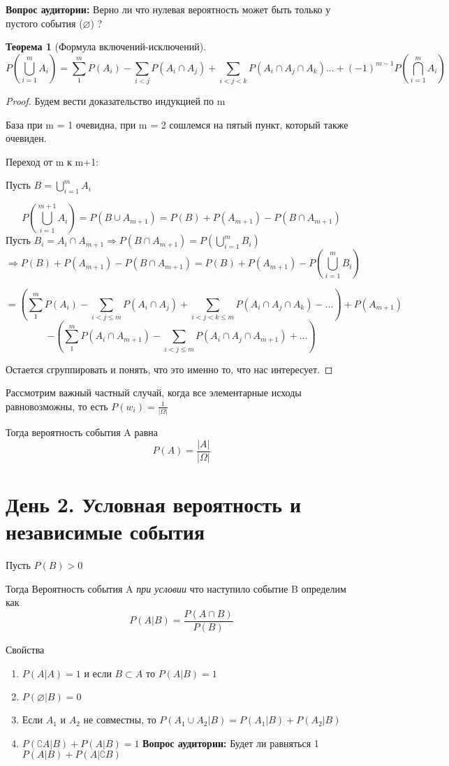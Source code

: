 \documentclass{article}
\renewcommand{\le}{\leqslant}
\newtheorem{theorem}{Теорема}
\theoremstyle{definition}
\newcommand{\question}{\textbf{Вопрос аудитории: }}
\theoremstyle{remark}
\begin{document}
\question{Верно ли что нулевая вероятность может быть только у пустого события ($\varnothing$) ?}

\begin{theorem} [Формула включений-исключений]
    $$ 
    P(\bigcup\limits_{i=1}^{m} A_i) = \sum_{1}^{m} P(A_i) - \sum_{i<j} P(A_i \cap A_j) + \sum_{i<j<k} P(A_i \cap A_j \cap A_k) ... + (-1)^{m-1} P(\bigcap\limits_{i=1}^{m} A_i)
    $$
\end{theorem}
\begin{proof}
    Будем вести доказательство индукцией по m

    База при m = 1 очевидна, при m = 2 сошлемся на пятый пункт, который также очевиден.

    Переход от m к m+1:

    Пусть $B = \bigcup\limits_{i=1}^{m} A_i$

    $$
    P(\bigcup\limits_{i=1}^{m+1} A_i) = P(B \cup A_{m+1}) = P(B) + P(A_{m+1}) - P(B \cap A_{m+1})
    $$
    Пусть $B_i = A_i \cap A_{m+1} \Rightarrow P(B \cap A_{m+1}) = P(\bigcup\limits_{i=1}^{m} B_i)$
    $$
    \Rightarrow P(B) + P(A_{m+1}) - P(B \cap A_{m+1}) = P(B) + P(A_{m+1}) - P(\bigcup\limits_{i=1}^{m} B_i) 
    $$

    $$
    = (\sum_{1}^{m} P(A_i)  - \sum_{i<j \le m} P(A_i \cap A_j)  + \sum_{i<j<k \le m} P(A_i \cap A_j \cap A_k) - ... ) + P(A_{m+1}) 
    $$
    $$
    - (\sum_{1}^{m} P(A_i \cap A_{m+1})  - \sum_{i<j \le m} P(A_i \cap A_j  \cap A_{m+1})  + ... )
    $$

    Остается сгруппировать и понять, что это именно то, что нас интересует.
\end{proof}

Рассмотрим важный частный случай, когда все элементарные исходы равновозможны, 
то есть $P(w_i) = \frac{1}{|\varOmega|}$

Тогда вероятность события A равна
$$
P(A) = \frac{|A|}{|\varOmega|}
$$


\section{День 2. Условная вероятность и независимые события}

Пусть $P(B) > 0$ 

Тогда Вероятность события A \textit{при условии} что наступило событие B определим как
$$
P(A | B) = \frac{P(A \cap B)}{P(B)}
$$

Свойства 
\begin{enumerate}
    \item $P(A | A) = 1$ и если $B \subset A$ то $P(A | B) = 1$
    \item $P(\varnothing | B) = 0$
    \item Если $A_1$ и $A_2$ не совместны, то $P(A_1 \cup A_2 | B) = P(A_1 | B) + P(A_2 | B)$
    \item $P(\complement{A} | B) + P(A | B) = 1$
    \question{Будет ли равняться 1 $P(A | B) + P(A | \complement{B})$}
\end{enumerate}
\end{document}
